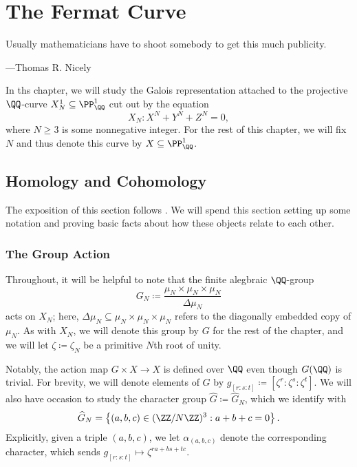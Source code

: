 \documentclass[../thesis.tex]{subfiles}
\begin{document}
\chapter{The Fermat Curve} \label{chap:fermat}

\epigraph{Usually mathematicians have to shoot somebody to get this much publicity.}{---Thomas R. Nicely}

In ths chapter, we will study the Galois representation attached to the projective $\QQ$-curve $X^1_N\subseteq\PP^1_\QQ$ cut out by the equation
\[X_N\colon X^N+Y^N+Z^N=0,\]
where $N\ge3$ is some nonnegative integer. %
For the rest of this chapter, we will fix $N$ and thus denote this curve by $X\subseteq\PP^1_\QQ$. %

\section{Homology and Cohomology}
The exposition of this section follows \cite[Sections~2 and~3]{otsubo-fermat}. We will spend this section setting up some notation and proving basic facts about how these objects relate to each other.

\subsection{The Group Action} \label{subsec:fermat-group-action}
Throughout, it will be helpful to note that the finite alegbraic $\QQ$-group
\[G_N\coloneqq\frac{\mu_N\times\mu_N\times\mu_N}{\Delta\mu_N}\]
acts on $X_N$; here, $\Delta\mu_N\subseteq\mu_N\times\mu_N\times\mu_N$ refers to the diagonally embedded copy of $\mu_N$. As with $X_N$, we will denote this group by $G$ for the rest of the chapter, and we will let $\zeta\coloneqq\zeta_N$ be a primitive $N$th root of unity.

Notably, the action map $G\times X\to X$ is defined over $\QQ$ even though $G(\QQ)$ is trivial. For brevity, we will denote elements of $G$ by $g_{[r:s:t]}\coloneqq\left[\zeta^r:\zeta^s:\zeta^t\right]$. We will also have occasion to study the character group $\widehat G\coloneqq\widehat G_N$, which we identify with
\[\widehat G_N=\left\{(a,b,c)\in(\ZZ/N\ZZ)^3:a+b+c=0\right\}.\]
Explicitly, given a triple $(a,b,c)$, we let $\alpha_{(a,b,c)}$ denote the corresponding character, which sends $g_{[r:s:t]}\mapsto\zeta^{ra+bs+tc}$.
\end{document}
